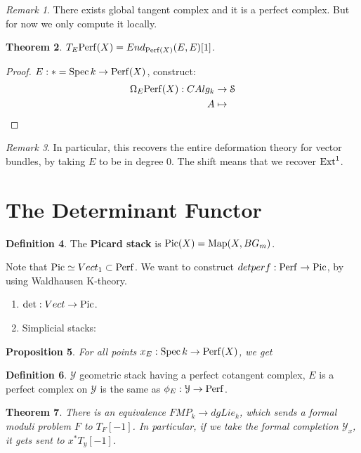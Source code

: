 \documentclass[10pt,a4paper,reqno,oneside]{book} %
\theoremstyle{plain}
\newtheorem{thm}{Theorem}[section]
\newtheorem{prop}[thm]{Proposition}
\theoremstyle{definition}
\newtheorem{defin}[thm]{Definition}
\theoremstyle{remark}
\newtheorem{rem}[thm]{Remark}
\numberwithin{equation}{section}
\begin{document}
\begin{rem}
There exists global tangent complex and it is a perfect complex. But for now we only compute it locally.
\end{rem}

\begin{thm}
\label{thm:tangent_perf}
$T_E \mathrm{Perf}(X) = End_{\mathrm{Perf}(X)}(E,E) [1]$. 
\end{thm}
\begin{proof}
$E : * = \operatorname{Spec} k \to \mathrm{Perf}(X)$, construct:
\begin{align*}
\Omega_E \mathrm{Perf}(X) : CAlg_k &\to \mathcal S \\
A &\mapsto 
\end{align*}
\end{proof}


\begin{rem}
In particular, this recovers the entire deformation theory for vector bundles, by taking $E$ to be in degree 0. The shift means
that we recover $\operatorname{Ext}^1$. 
\end{rem}


\section{The Determinant Functor}
\begin{defin}
The \textbf{Picard stack} is $\operatorname{Pic}(X) = \operatorname{Map}(X, B G_m)$.
\end{defin}

Note that $\operatorname{Pic} \simeq Vect_1 \subset \mathrm{Perf}$. We want to construct $detperf: \mathrm{Perf} \to \operatorname{Pic}$, by using Waldhausen K-theory.
\begin{enumerate}
\item $\det : Vect \to \operatorname{Pic}$.
\item Simplicial stacks:
\end{enumerate}


\begin{prop}
For all points $x_E: \operatorname{Spec} k \to \mathrm{Perf}(X)$, we get 
\end{prop}

\begin{defin}
$\mathcal{Y}$ geometric stack having a perfect cotangent complex, $E$ is a perfect complex on $\mathcal{Y}$ is the same as
$\phi_E : \mathcal{Y} \to \mathrm{Perf}$. 
\end{defin}


\begin{thm}
There is an equivalence $FMP_k \to dgLie_k$, which sends a formal moduli problem $F$ to $T_F[-1]$. In particular, if we
take the formal completion $\mathcal{Y}_x$, it gets sent to $x^* T_y[-1]$.
\end{thm}
\end{document}
